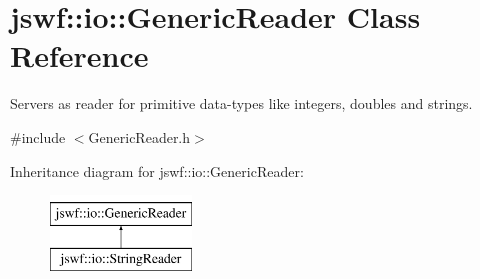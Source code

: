 \hypertarget{classjswf_1_1io_1_1_generic_reader}{\section{jswf\+:\+:io\+:\+:Generic\+Reader Class Reference}
\label{classjswf_1_1io_1_1_generic_reader}
}


Servers as reader for primitive data-\/types like integers, doubles and strings.  




{\ttfamily \#include $<$Generic\+Reader.\+h$>$}

Inheritance diagram for jswf\+:\+:io\+:\+:Generic\+Reader\+:\begin{figure}[H]
\begin{center}
\leavevmode
\includegraphics[height=2.000000cm]{classjswf_1_1io_1_1_generic_reader}
\end{center}
\end{figure}
